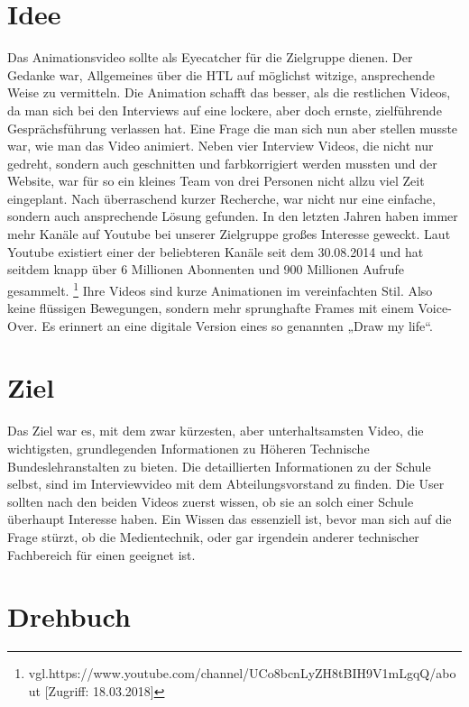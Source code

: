 \section{Idee}
\renewcommand{\kapitelautor}{Autor: Niklas Kienreich}
Das Animationsvideo sollte als Eyecatcher für die Zielgruppe dienen. Der Gedanke war, Allgemeines über die HTL auf möglichst witzige, ansprechende Weise zu vermitteln. Die Animation schafft das besser, als die restlichen Videos, da man sich bei den Interviews auf eine lockere, aber doch ernste, zielführende Gesprächsführung verlassen hat. Eine Frage die man sich nun aber stellen musste war, wie man das Video animiert. Neben vier Interview Videos, die nicht nur gedreht, sondern auch geschnitten und farbkorrigiert werden mussten und der Website, war für so ein kleines Team von drei Personen nicht allzu viel Zeit eingeplant. Nach überraschend kurzer Recherche, war nicht nur eine einfache, sondern auch ansprechende Lösung gefunden. In den letzten Jahren haben immer mehr Kanäle auf Youtube bei unserer Zielgruppe großes Interesse geweckt. Laut Youtube existiert einer der beliebteren Kanäle seit dem 30.08.2014 und hat seitdem knapp über 6 Millionen Abonnenten und 900 Millionen Aufrufe gesammelt. \footnote{\label{} vgl.https://www.youtube.com/channel/UCo8bcnLyZH8tBIH9V1mLgqQ/about [Zugriff: 18.03.2018]} Ihre Videos sind kurze Animationen im vereinfachten Stil. Also keine flüssigen Bewegungen, sondern mehr sprunghafte Frames mit einem Voice-Over. Es erinnert an eine digitale Version eines so genannten „Draw my life“.

\section{Ziel}
\renewcommand{\kapitelautor}{Autor: Niklas Kienreich}
Das Ziel war es, mit dem zwar kürzesten, aber unterhaltsamsten Video, die wichtigsten, grundlegenden Informationen zu Höheren Technische Bundeslehranstalten zu bieten. Die detaillierten Informationen zu der Schule selbst, sind im Interviewvideo mit dem Abteilungsvorstand zu finden. Die User sollten nach den beiden Videos zuerst wissen, ob sie an solch einer Schule überhaupt Interesse haben. Ein Wissen das essenziell ist, bevor man sich auf die Frage stürzt, ob die Medientechnik, oder gar irgendein anderer technischer Fachbereich für einen geeignet ist.

\section{Drehbuch}
\renewcommand{\kapitelautor}{Autor: Niklas Kienreich}

